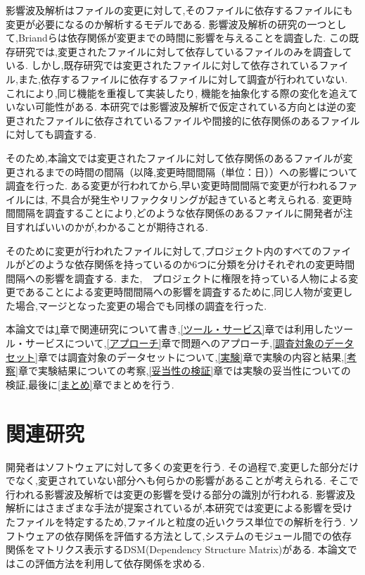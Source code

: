 \documentclass{fose2016}           %
\begin{document}
影響波及解析はファイルの変更に対して,そのファイルに依存するファイルにも変更が必要になるのか解析するモデルである.
影響波及解析の研究の一つとして,Briand\cite{Briand}らは依存関係が変更までの時間に影響を与えることを調査した.
この既存研究では,変更されたファイルに対して依存しているファイルのみを調査している.
しかし,既存研究では変更されたファイルに対して依存されているファイル,また,依存するファイルに依存するファイルに対して調査が行われていない.
これにより,同じ機能を重複して実装したり, 機能を抽象化する際の変化を追えていない可能性がある.
本研究では影響波及解析で仮定されている方向とは逆の変更されたファイルに依存されているファイルや間接的に依存関係のあるファイルに対しても調査する.

そのため,本論文では変更されたファイルに対して依存関係のあるファイルが変更されるまでの時間の間隔（以降,変更時間間隔（単位：日））への影響について調査を行った.
ある変更が行われてから,早い変更時間間隔で変更が行われるファイルには, 不具合が発生やリファクタリングが起きていると考えられる.
変更時間間隔を調査することにより,どのような依存関係のあるファイルに開発者が注目すればいいのかが,わかることが期待される.

そのために変更が行われたファイルに対して,プロジェクト内のすべてのファイルがどのような依存関係を持っているのか6つに分類を分けそれぞれの変更時間間隔への影響を調査する.
また,　プロジェクトに権限を持っている人物による変更であることによる変更時間間隔への影響を調査するために,同じ人物が変更した場合,マージとなった変更の場合でも同様の調査を行った.

本論文では\ref{関連研究}章で関連研究について書き,\ref{ツール・サービス}章では利用したツール・サービスについて,\ref{アプローチ}章で問題へのアプローチ,\ref{調査対象のデータセット}章では調査対象のデータセットについて,\ref{実験}章で実験の内容と結果,\ref{考察}章で実験結果についての考察,\ref{妥当性の検証}章では実験の妥当性についての検証,最後に\ref{まとめ}章でまとめを行う.


\section{関連研究}\label{関連研究}
開発者はソフトウェアに対して多くの変更を行う.
その過程で,変更した部分だけでなく,変更されていない部分へも何らかの影響があることが考えられる.
そこで行われる影響波及解析では変更の影響を受ける部分の識別が行われる.
影響波及解析にはさまざまな手法が提案されているが\cite{Ryder,Kondo},本研究では変更による影響を受けたファイルを特定するため,ファイルと粒度の近いクラス単位での解析\cite{Ryder}を行う.
ソフトウェアの依存関係を評価する方法として,システムのモジュール間での依存関係をマトリクス表示するDSM(Dependency Structure Matrix)がある.\cite{Nord}
本論文ではこの評価方法を利用して依存関係を求める.
\end{document}
